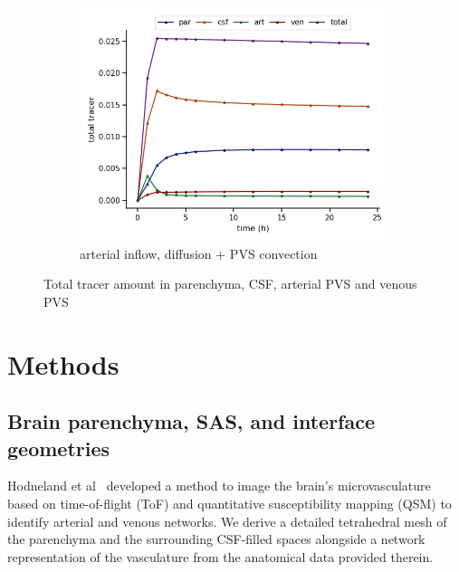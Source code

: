 \documentclass[fleqn,10pt]{wlscirep}
\newcommand{\mer}[1]{\textcolor{magenta}{#1}}
\begin{document}
\begin{figure}
\begin{subfigure}[b]{0.33\textwidth}
         \centering
         \includegraphics[width=\textwidth]{modelC_total_conc.png}
         \caption{arterial inflow, diffusion + PVS convection}
         \label{fig:five over x}
     \end{subfigure}
        \caption{Total tracer amount in parenchyma, CSF, arterial PVS and venous PVS}
        \label{fig:three graphs}
\end{figure}

\fi

\newpage
\section*{Methods}


\subsection*{Brain parenchyma, SAS, and interface geometries}

Hodneland et al~\cite{hodneland2019new} developed a method to image
the brain's microvasculature based on time-of-flight (ToF) and
quantitative susceptibility mapping (QSM) to identify arterial and
venous networks. We derive a detailed tetrahedral mesh of the
parenchyma and the surrounding CSF-filled spaces alongside a network
representation of the vasculature from the anatomical data provided
therein.
\end{document}
